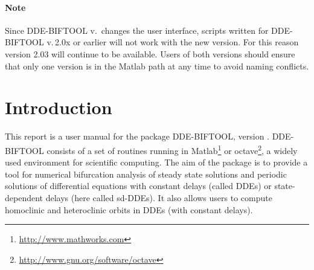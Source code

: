 \documentclass[10pt]{scrartcl}
\newcommand{\DDEBIFCODE}{\textsc{DDE-BIFTOOL}}
\newcommand{\ddebifweb}{\url{http://twr.cs.kuleuven.be/research/software/delay/ddebiftool.shtml}}
\begin{document}
\paragraph{Note}
Since \DDEBIFCODE{} v.\,\version{} changes the user interface, scripts
written for \DDEBIFCODE{} v.\,2.0x or earlier will not work with the
new version. For this reason version 2.03 will continue to be
available. Users of both versions should ensure that only one version
is in the Matlab path at any time to avoid naming conflicts.

\section{Introduction}
\label{sec:intro}
This report is a user manual for the package {\DDEBIFCODE}, version
\version{}. {\DDEBIFCODE} consists of a set of routines running in
Matlab\footnote{\url{http://www.mathworks.com}} \cite{Mat00} or
octave\footnote{\url{http://www.gnu.org/software/octave}}, a widely
used environment for scientific computing.  The aim of the package is
to provide a tool for numerical bifurcation analysis of steady state
solutions and periodic solutions of differential equations with
constant delays (called DDEs) or state-dependent delays (here called
sd-DDEs).  It also allows users to compute homoclinic and heteroclinic
orbits in DDEs (with constant delays).  


\end{document}
